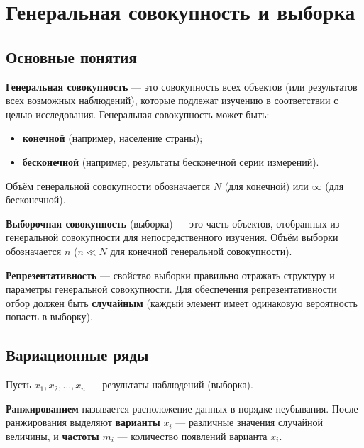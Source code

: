 \documentclass[10pt]{article}
\begin{document}
\section{Генеральная совокупность и выборка}

\subsection{Основные понятия}

\begin{definition}
\textbf{Генеральная совокупность} — это совокупность всех объектов (или результатов всех возможных наблюдений), которые подлежат изучению в соответствии с целью исследования. Генеральная совокупность может быть:
\begin{itemize}
    \item \textbf{конечной} (например, население страны);
    \item \textbf{бесконечной} (например, результаты бесконечной серии измерений).
\end{itemize}
Объём генеральной совокупности обозначается $N$ (для конечной) или $\infty$ (для бесконечной).
\end{definition}

\begin{definition}
\textbf{Выборочная совокупность} (выборка) — это часть объектов, отобранных из генеральной совокупности для непосредственного изучения. Объём выборки обозначается $n$ ($n \ll N$ для конечной генеральной совокупности).
\end{definition}

\begin{definition}
\textbf{Репрезентативность} — свойство выборки правильно отражать структуру и параметры генеральной совокупности. Для обеспечения репрезентативности отбор должен быть \textbf{случайным} (каждый элемент имеет одинаковую вероятность попасть в выборку).
\end{definition}

\subsection{Вариационные ряды}

Пусть $x_1, x_2, \dots, x_n$ — результаты наблюдений (выборка).

\begin{definition}
\textbf{Ранжированием} называется расположение данных в порядке неубывания. После ранжирования выделяют \textbf{варианты} $x_i$ — различные значения случайной величины, и \textbf{частоты} $m_i$ — количество появлений варианта $x_i$.
\end{definition}
\end{document}

